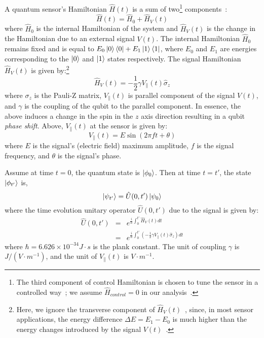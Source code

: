 A quantum sensor's Hamiltonian $\hat{H}(t)$ is a sum of two\footnote{The third component 
of control Hamiltonian is chosen to tune the sensor in a controlled way~\cite{RevModPhys.quantumsensing}; we assume $\hat{H}_{control}=0$ in our analysis~\cite{egerstrom}.}
components~\cite{RevModPhys.quantumsensing}:
$$\hat{H}(t) = \hat{H}_0 + \hat{H}_V(t)$$
where $\hat{H}_0$ is the internal Hamiltonian of the system and
$\hat{H}_V(t)$ is the change in the Hamiltonian due to an external signal $V(t)$.
The internal Hamiltonian $\hat{H}_0$ remains fixed and is equal to $E_0 \ket{0}\bra{0} + E_1\ket{1}\bra{1}$, where $E_0$ and $E_1$ are energies corresponding to the 
$\ket{0}$ and $\ket{1}$ states respectively. 
The signal Hamiltonian $\hat{H}_V(t)$ is given by:\footnote{Here, we ignore the 
transverse component of $\hat{H}_V(t)$~\cite{egerstrom}, since, in most sensor applications, the
energy difference $\Delta E = E_1 - E_0$ is much higher than the energy 
changes introduced by the signal $V(t)$~\cite{RevModPhys.quantumsensing}.}
$$\hat{H}_{V}(t) =  -\frac{1}{2}\gamma V_{\parallel}(t)\hat{\sigma}_z$$
where $\sigma_z$ is the Pauli-Z matrix, $V_{\parallel}(t)$ is parallel component of the signal $V(t)$, and $\gamma$ is the coupling of the qubit to the parallel component.
In essence, the above induces a change in the spin in the $z$ axis direction resulting
in a  qubit \emph{phase shift}. Above, 
${V_{\parallel}}(t)$ at the sensor is given by:
$$V_{\parallel}(t) = E \sin(2\pi f  t + \theta)$$
where $E$ is the signal's (electric field) maximum amplitude, $f$ is the signal 
frequency, and $\theta$ is the signal's phase.

 Assume at time $t=0$, the quantum state is $\ket{\phi_0}$. Then at time $t=t'$, the state $\ket{\phi_{t'}}$ is,
$$ \ket{\psi_{t'}} = \hat{U}(0, t') \ket{\psi_0} $$
where the time evolution unitary operator $\hat{U}(0, t')$ due to the signal is given by:
\begin{eqnarray*}
\hat{U}(0, t') &=& e^{\frac{i}{\hbar} \int_{0}^{t'} \hat{H}_V(t) dt}  \\
&=& e^{\frac{i}{\hbar} \int_{0}^{t'} (-\frac{1}{2}\gamma V_{\parallel}(t)\hat{\sigma}_z) dt} 
\end{eqnarray*}
where $\hbar=6.626\times 10^{-34} J\cdot s$ is the plank constant.
The unit of coupling $\gamma$ is $J/(V\cdot m^{-1})$, and the unit of $V_{\parallel}(t)$ is $V\cdot m^{-1}$.

